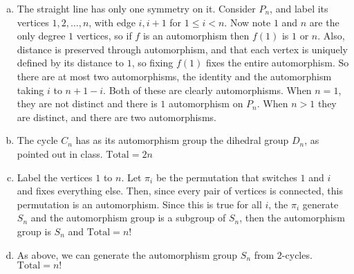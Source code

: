 \begin{enumerate}[(a)]
\item The straight line has only one symmetry on it.
Consider $P_n$, and label its vertices $1,2,\dots, n$, with edge $i,i+1$
for $1 \le i < n$. Now note $1$ and $n$ are the only degree $1$ vertices, so
if $f$ is an automorphism then $f(1)$ is $1$ or $n$. Also, distance
is preserved through automorphism, and that each vertex is uniquely defined by
its distance to $1$, so fixing $f(1)$ fixes the entire automorphism. So there
are at most two automorphisms, the identity and the automorphism taking $i$ to
$n+1-i$. Both of these are clearly automorphisms. When $n=1$, they are not
distinct and there is $1$ automorphism on $P_n$. When $n>1$ they are distinct,
and there are two automorphisms.
\item The cycle $C_n$ has as its automorphism group the dihedral group 
$D_n$, as pointed out in class. $\text{Total} = 2n$
\item Label the vertices $1$ to $n$. Let $\pi_i$ be the permutation
that switches $1$ and $i$ and fixes everything else. Then, since every pair of
vertices is connected, this permutation is an automorphism. Since this is true
for all $i$, the $\pi_i$ generate $S_n$ and the automorphism group is a subgroup
of $S_n$, then the automorphism group is $S_n$
and $\text{Total}=n!$
\item As above, we can generate the automorphism group $S_n$ from 
$2$-cycles. $\text{Total} = n!$
\end{enumerate}
